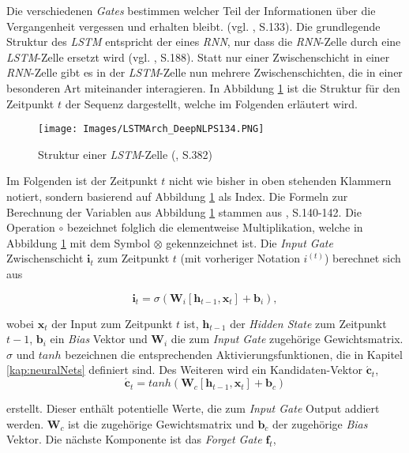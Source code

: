 \documentclass[a4paper,11pt]{article}
\begin{document}
Die verschiedenen \textit{Gates} bestimmen welcher Teil der Informationen über die Vergangenheit vergessen und erhalten bleibt. (vgl. \cite{deepNLP}, S.133). Die grundlegende Struktur des \textit{LSTM} entspricht der eines \textit{RNN}, nur dass die \textit{RNN}-Zelle durch eine \textit{LSTM}-Zelle ersetzt wird (vgl. \cite{keras}, S.188). Statt nur einer Zwischenschicht in einer \textit{RNN}-Zelle gibt es in der \textit{LSTM}-Zelle nun mehrere Zwischenschichten, die in einer besonderen Art miteinander interagieren. In Abbildung \ref{abb:LSTMArch} ist die Struktur für den Zeitpunkt $t$ der Sequenz dargestellt, welche im Folgenden erläutert wird.


\begin{figure}[!ht]
\begin{center}
\texttt{[image: Images/LSTMArch\_DeepNLPS134.PNG]}
\caption{Struktur einer \textit{LSTM}-Zelle (\cite{deepNLP}, S.382)}
\label{abb:LSTMArch}
\end{center}
\end{figure}

Im Folgenden ist der Zeitpunkt $t$ nicht wie bisher in oben stehenden Klammern notiert, sondern basierend auf Abbildung \ref{abb:LSTMArch} als Index. Die Formeln zur Berechnung der Variablen aus Abbildung \ref{abb:LSTMArch} stammen aus \cite{deepNLP}, S.140-142.
Die Operation $\circ$ bezeichnet folglich die elementweise Multiplikation, welche in Abbildung \ref{abb:LSTMArch} mit dem Symbol $\otimes$ gekennzeichnet ist.
Die \textit{Input Gate} Zwischenschicht $\bm{i}_t$ zum Zeitpunkt $t$ (mit vorheriger Notation $i^{(t)}$)  berechnet sich aus

\[ \bm{i}_t = \sigma(\bm{W}_i [\bm{h}_{t-1}, \bm{x}_t] + \bm{b}_i),\]

wobei $\bm{x}_t$ der Input zum Zeitpunkt $t$ ist, $\bm{h}_{t-1}$ der \textit{Hidden State} zum Zeitpunkt $t-1$, $\bm{b}_i$ ein \textit{Bias} Vektor und $\bm{W}_i$ die zum \textit{Input Gate} zugehörige Gewichtsmatrix. $\sigma$ und $tanh$ bezeichnen die entsprechenden Aktivierungsfunktionen, die in Kapitel \ref{kap:neuralNets} definiert sind. Des Weiteren wird ein Kandidaten-Vektor $\bm{\acute{c}}_t$, 
\[\bm{\acute{c}}_t = tanh(\bm{W}_c [\bm{h}_{t-1}, \bm{x}_t] + \bm{b}_c)\]

erstellt. Dieser enthält potentielle Werte, die zum \textit{Input Gate} Output addiert werden. $\bm{W}_c$ ist die zugehörige Gewichtsmatrix und $\bm{b}_c$ der zugehörige \textit{Bias} Vektor. Die nächste Komponente ist das \textit{Forget Gate} $\bm{f}_t$,
\end{document}

